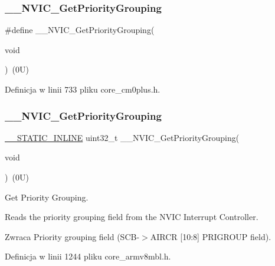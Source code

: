 \subsubsection{\texorpdfstring{\+\_\+\+\_\+\+N\+V\+I\+C\+\_\+\+Get\+Priority\+Grouping}{\_\_NVIC\_GetPriorityGrouping}\hspace{0.1cm}{\footnotesize\ttfamily [3/5]}}
{\footnotesize\ttfamily \#define \+\_\+\+\_\+\+N\+V\+I\+C\+\_\+\+Get\+Priority\+Grouping(\begin{DoxyParamCaption}\item[{}]{void }\end{DoxyParamCaption})~(0\+U)}



Definicja w linii 733 pliku core\+\_\+cm0plus.\+h.

\mbox{\label{group___c_m_s_i_s___core___n_v_i_c_functions_gae1de06155d072758b3453edb07d12459}} 
\subsubsection{\texorpdfstring{\+\_\+\+\_\+\+N\+V\+I\+C\+\_\+\+Get\+Priority\+Grouping}{\_\_NVIC\_GetPriorityGrouping}\hspace{0.1cm}{\footnotesize\ttfamily [4/5]}}
{\footnotesize\ttfamily \hyperlink{cmsis__iccarm_8h_aba87361bfad2ae52cfe2f40c1a1dbf9c}{\+\_\+\+\_\+\+S\+T\+A\+T\+I\+C\+\_\+\+I\+N\+L\+I\+NE} uint32\+\_\+t \+\_\+\+\_\+\+N\+V\+I\+C\+\_\+\+Get\+Priority\+Grouping(\begin{DoxyParamCaption}\item[{}]{void }\end{DoxyParamCaption})~(0\+U)}



Get Priority Grouping. 

Reads the priority grouping field from the N\+V\+IC Interrupt Controller. \begin{DoxyReturn}{Zwraca}
Priority grouping field (S\+C\+B-\/$>$A\+I\+R\+CR \mbox{[}10\+:8\mbox{]} P\+R\+I\+G\+R\+O\+UP field). 
\end{DoxyReturn}


Definicja w linii 1244 pliku core\+\_\+armv8mbl.\+h.

